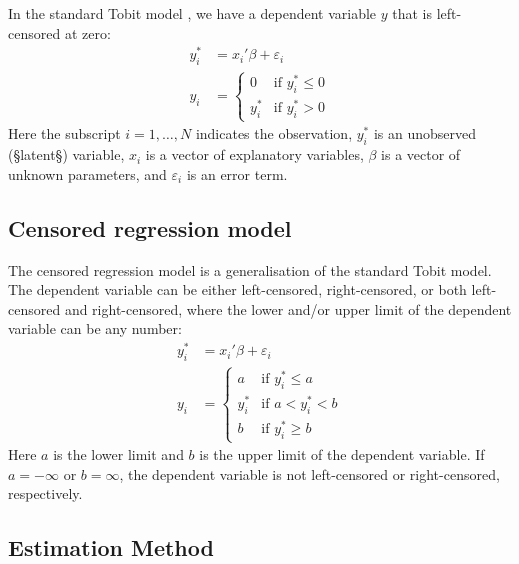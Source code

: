 \documentclass[article,nojss]{jss}
\begin{document}
In the standard Tobit model \citep{tobin58},
we have a dependent variable $y$ that is left-censored at zero:
\begin{align}
y_i^* &= x_i ' \beta + \varepsilon_i\\
y_i &=
   \begin{cases}
   0     & \text{if } y_i^* \leq 0\\
   y_i^* & \text{if } y_i^* > 0
   \end{cases}
\end{align}
Here the subscript $i = 1, \ldots , N$ indicates the observation,
$y_i^*$ is an unobserved (§latent§) variable,
$x_i$ is a vector of explanatory variables,
$\beta$ is a vector of unknown parameters, and
$\varepsilon_i$ is an error term.


\subsection{Censored regression model}

The censored regression model is a generalisation of the standard Tobit model.
The dependent variable can be either left-censored, right-censored,
or both left-censored and right-censored,
where the lower and/or upper limit of the dependent variable can be any number:
\begin{align}
y_i^* &= x_i ' \beta + \varepsilon_i\\
y_i &=
   \begin{cases}
   a     & \text{if } y_i^* \leq a\\
   y_i^* & \text{if } a < y_i^* < b\\
   b     & \text{if } y_i^* \geq b
   \end{cases}
\end{align}
Here $a$ is the lower limit and $b$ is the upper limit
of the dependent variable.
If $a = -\infty$ or $b = \infty$,
the dependent variable is not left-censored or right-censored,
respectively.


\subsection{Estimation Method}
\end{document}
